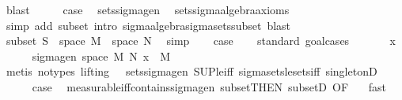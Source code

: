 \begin{isabellebody}
\ blast\isanewline
\ \ \isamarkupfalse%
\ \isamarkupfalse%
\ {\isacharquery}{\kern0pt}case\ \isamarkupfalse%
\ sets{\isacharunderscore}{\kern0pt}sigma{\isacharunderscore}{\kern0pt}gen\ \isamarkupfalse%
\ sets{\isachardot}{\kern0pt}sigma{\isacharunderscore}{\kern0pt}algebra{\isacharunderscore}{\kern0pt}axioms\ \isamarkupfalse%
\ {\isacharparenleft}{\kern0pt}simp\ add{\isacharcolon}{\kern0pt}\ subset{\isacharcomma}{\kern0pt}\ intro\ sigma{\isacharunderscore}{\kern0pt}algebra{\isachardot}{\kern0pt}sigma{\isacharunderscore}{\kern0pt}sets{\isacharunderscore}{\kern0pt}subset{\isacharcomma}{\kern0pt}\ blast{\isacharplus}{\kern0pt}{\isacharparenright}{\kern0pt}\isanewline
{}\isamarkupfalse%
\isanewline
\ \ \isamarkupfalse%
\ {}\isanewline
\ \ \isamarkupfalse%
\ subset{\isacharcolon}{\kern0pt}\ {\isachardoublequoteopen}S\ {\isasymsubseteq}\ space\ M\ {\isasymrightarrow}\ space\ N{\isachardoublequoteclose}\ \isamarkupfalse%
\ simp\isanewline
\ \ \isamarkupfalse%
\ {\isacharquery}{\kern0pt}case\isanewline
\ \ \isamarkupfalse%
\ {\isacharparenleft}{\kern0pt}standard{\isacharcomma}{\kern0pt}\ goal{\isacharunderscore}{\kern0pt}cases{\isacharparenright}{\kern0pt}\isanewline
\ \ \ \ \isamarkupfalse%
\ {\isacharparenleft}{\kern0pt}{}\ x{\isacharparenright}{\kern0pt}\isanewline
\ \ \ \ \isamarkupfalse%
\ {\isachardoublequoteopen}sigma{\isacharunderscore}{\kern0pt}gen\ {\isacharparenleft}{\kern0pt}space\ M{\isacharparenright}{\kern0pt}\ N\ {\isacharbraceleft}{\kern0pt}x{\isacharbraceright}{\kern0pt}\ {\isasymsubseteq}\ M{\isachardoublequoteclose}\ \isamarkupfalse%
\ {\isacharparenleft}{\kern0pt}metis\ {\isacharparenleft}{\kern0pt}no{\isacharunderscore}{\kern0pt}types{\isacharcomma}{\kern0pt}\ lifting{\isacharparenright}{\kern0pt}\ {}\ {}\ sets{\isacharunderscore}{\kern0pt}sigma{\isacharunderscore}{\kern0pt}gen\ SUP{\isacharunderscore}{\kern0pt}le{\isacharunderscore}{\kern0pt}iff\ sigma{\isacharunderscore}{\kern0pt}sets{\isacharunderscore}{\kern0pt}le{\isacharunderscore}{\kern0pt}sets{\isacharunderscore}{\kern0pt}iff\ singletonD{\isacharparenright}{\kern0pt}\isanewline
\ \ \ \ \isamarkupfalse%
\ {\isacharquery}{\kern0pt}case\ \isamarkupfalse%
\ measurable{\isacharunderscore}{\kern0pt}iff{\isacharunderscore}{\kern0pt}contains{\isacharunderscore}{\kern0pt}sigma{\isacharunderscore}{\kern0pt}gen\ subset{\isacharbrackleft}{\kern0pt}THEN\ subsetD{\isacharcomma}{\kern0pt}\ OF\ {}{\isacharbrackright}{\kern0pt}\ \isamarkupfalse%
\ fast\ \isanewline
\ \ \isamarkupfalse%
\isanewline
{}\isamarkupfalse%
%
\endisatagproof
{\isafoldproof}%
%
\isadelimproof
\isanewline
%
\endisadelimproof
%
\isadelimtheory
\isanewline
%
\endisadelimtheory
%
\isatagtheory
{}\isamarkupfalse%
%
\endisatagtheory
{\isafoldtheory}%
%
\isadelimtheory
%
\endisadelimtheory
%
\end{isabellebody}%
